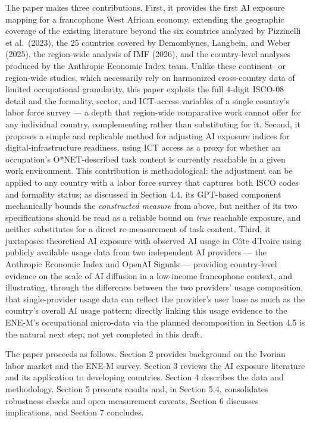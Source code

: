 \documentclass[
  11pt,
]{article}
\begin{document}
The paper makes three contributions. First, it provides the first AI
exposure mapping for a francophone West African economy, extending the
geographic coverage of the existing literature beyond the six countries
analyzed by Pizzinelli et al.~(2023), the 25 countries covered by
Demombynes, Langbein, and Weber (2025), the region-wide analysis of IMF
(2026), and the country-level analyses produced by the Anthropic
Economic Index team. Unlike these continent- or region-wide studies,
which necessarily rely on harmonized cross-country data of limited
occupational granularity, this paper exploits the full 4-digit ISCO-08
detail and the formality, sector, and ICT-access variables of a single
country's labor force survey --- a depth that region-wide comparative
work cannot offer for any individual country, complementing rather than
substituting for it. Second, it proposes a simple and replicable method
for adjusting AI exposure indices for digital-infrastructure readiness,
using ICT access as a proxy for whether an occupation's O*NET-described
task content is currently reachable in a given work environment. This
contribution is methodological: the adjustment can be applied to any
country with a labor force survey that captures both ISCO codes and
formality status; as discussed in Section 4.4, its GPT-based component
mechanically bounds the \emph{constructed measure} from above, but
neither of its two specifications should be read as a reliable bound on
\emph{true} reachable exposure, and neither substitutes for a direct
re-measurement of task content. Third, it juxtaposes theoretical AI
exposure with observed AI usage in Côte d'Ivoire using publicly
available usage data from two independent AI providers --- the Anthropic
Economic Index and OpenAI Signals --- providing country-level evidence
on the scale of AI diffusion in a low-income francophone context, and
illustrating, through the difference between the two providers' usage
composition, that single-provider usage data can reflect the provider's
user base as much as the country's overall AI usage pattern; directly
linking this usage evidence to the ENE-M's occupational micro-data via
the planned decomposition in Section 4.5 is the natural next step, not
yet completed in this draft.

The paper proceeds as follows. Section 2 provides background on the
Ivorian labor market and the ENE-M survey. Section 3 reviews the AI
exposure literature and its application to developing countries. Section
4 describes the data and methodology. Section 5 presents results and, in
Section 5.4, consolidates robustness checks and open measurement
caveats. Section 6 discusses implications, and Section 7 concludes.
\end{document}
